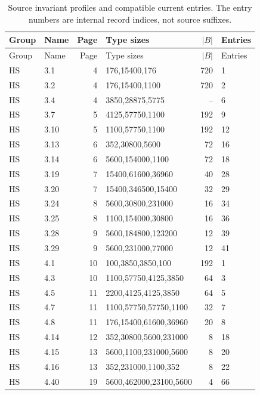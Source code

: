 \begin{longtable}{@{}llrlrl@{}}
\caption{Source invariant profiles and compatible current entries.
The entry numbers are internal record indices, not source suffixes.}\\
\toprule Group&Name&Page&Type sizes&$|B|$&Entries\\\midrule
\endfirsthead
\toprule Group&Name&Page&Type sizes&$|B|$&Entries\\\midrule
\endhead
\bottomrule\endfoot
$\mathrm{HS}$ & 3.1 & 4 & 176,15400,176 & 720 & 1 \\
$\mathrm{HS}$ & 3.2 & 4 & 176,15400,1100 & 720 & 2 \\
$\mathrm{HS}$ & 3.4 & 4 & 3850,28875,5775 & -- & 6 \\
$\mathrm{HS}$ & 3.7 & 5 & 4125,57750,1100 & 192 & 9 \\
$\mathrm{HS}$ & 3.10 & 5 & 1100,57750,1100 & 192 & 12 \\
$\mathrm{HS}$ & 3.13 & 6 & 352,30800,5600 & 72 & 16 \\
$\mathrm{HS}$ & 3.14 & 6 & 5600,154000,1100 & 72 & 18 \\
$\mathrm{HS}$ & 3.19 & 7 & 15400,61600,36960 & 40 & 28 \\
$\mathrm{HS}$ & 3.20 & 7 & 15400,346500,15400 & 32 & 29 \\
$\mathrm{HS}$ & 3.24 & 8 & 5600,30800,231000 & 16 & 34 \\
$\mathrm{HS}$ & 3.25 & 8 & 1100,154000,30800 & 16 & 36 \\
$\mathrm{HS}$ & 3.28 & 9 & 5600,184800,123200 & 12 & 39 \\
$\mathrm{HS}$ & 3.29 & 9 & 5600,231000,77000 & 12 & 41 \\
$\mathrm{HS}$ & 4.1 & 10 & 100,3850,3850,100 & 192 & 1 \\
$\mathrm{HS}$ & 4.3 & 10 & 1100,57750,4125,3850 & 64 & 3 \\
$\mathrm{HS}$ & 4.5 & 11 & 2200,4125,4125,3850 & 64 & 5 \\
$\mathrm{HS}$ & 4.7 & 11 & 1100,57750,57750,1100 & 32 & 7 \\
$\mathrm{HS}$ & 4.8 & 11 & 176,15400,61600,36960 & 20 & 8 \\
$\mathrm{HS}$ & 4.14 & 12 & 352,30800,5600,231000 & 8 & 18 \\
$\mathrm{HS}$ & 4.15 & 13 & 5600,1100,231000,5600 & 8 & 20 \\
$\mathrm{HS}$ & 4.16 & 13 & 352,231000,1100,352 & 8 & 22 \\
$\mathrm{HS}$ & 4.40 & 19 & 5600,462000,23100,5600 & 4 & 66 \\

\end{longtable}
